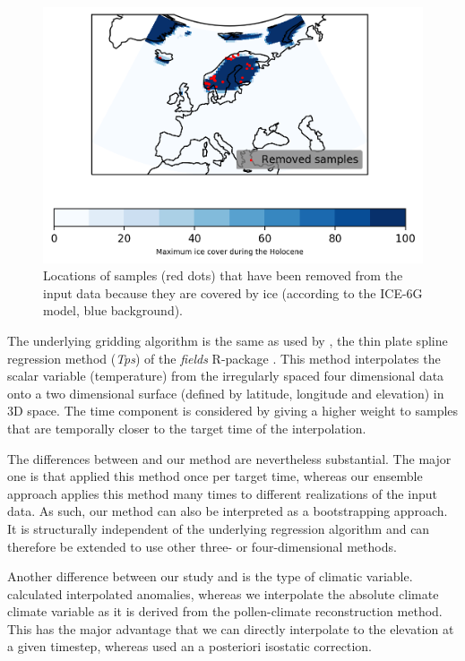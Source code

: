 \begin{refsection}
\begin{figure}
\includegraphics[width=\linewidth]{gridding-figures/elevation-mask.png}
\caption[Ice sheet mask of the pollen samples]{Locations of samples (red dots) that have been removed from the input data because they are covered by ice (according to the ICE-6G model, blue background). }
\label{fig:gridding-elev-mask}
\end{figure}

The underlying gridding algorithm is the same as used by \cite{MauriDavisCollinsEtAl2015}, the thin plate spline regression method (\textit{Tps}) of the \textit{fields} R-package \citep{DouglasNychkaReinhardFurrerJohnPaigeEtAl2017, RCT2019}. This method interpolates the scalar variable (temperature) from the irregularly spaced four dimensional data onto a two dimensional surface (defined by latitude, longitude and elevation) in 3D space. The time component is considered by giving a higher weight to samples that are temporally closer to the target time of the interpolation.

The differences between \cite{MauriDavisCollinsEtAl2015} and our method are nevertheless substantial. The major one is that \cite{MauriDavisCollinsEtAl2015} applied this method once per target time, whereas our ensemble approach applies this method many times to different realizations of the input data. As such, our method can also be interpreted as a bootstrapping approach. It is structurally independent of the underlying regression algorithm and can therefore be extended to use other three- or four-dimensional methods.

Another difference between our study and \cite{MauriDavisCollinsEtAl2015} is the type of climatic variable. \cite{MauriDavisCollinsEtAl2015} calculated interpolated anomalies, whereas we interpolate the absolute climate climate variable as it is derived from the pollen-climate reconstruction method. This has the major advantage that we can directly interpolate to the elevation at a given timestep, whereas \cite{MauriDavisCollinsEtAl2015} used an a posteriori isostatic correction. 


\end{refsection}
